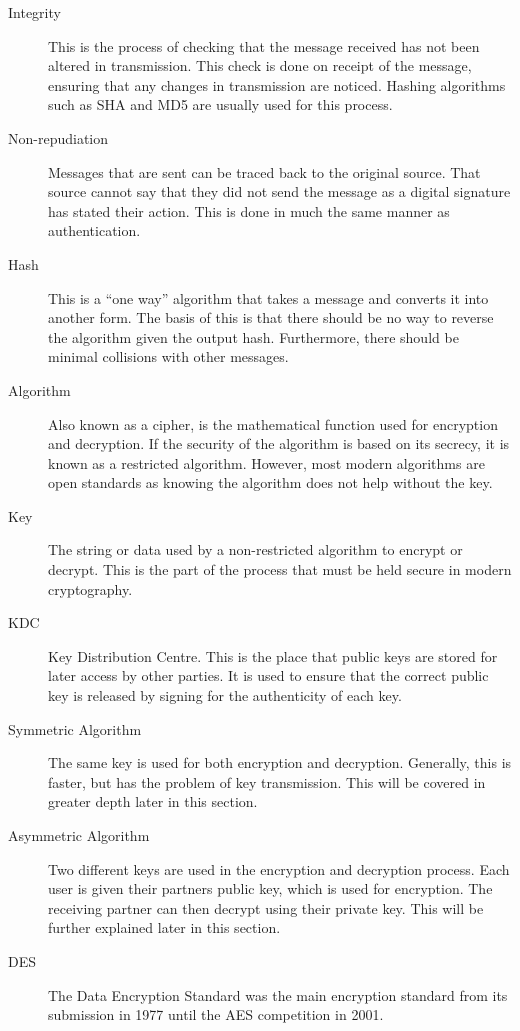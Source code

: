 \begin{description}
				\item[Integrity]
					This is the process of checking that the message received has not been altered in transmission.
					This check is done on receipt of the message, ensuring that any changes in transmission are noticed.
					Hashing algorithms such as SHA and MD5 are usually used for this process.
				\item[Non-repudiation]
					Messages that are sent can be traced back to the original source.
					That source cannot say that they did not send the message as a digital signature has stated their action.
					This is done in much the same manner as authentication.
				\item[Hash]
					This is a ``one way'' algorithm that takes a message and converts it into another form.
					The basis of this is that there should be no way to reverse the algorithm given the output hash.
					Furthermore, there should be minimal collisions with other messages.
				\item[Algorithm] Also known as a cipher, is the mathematical function used for encryption and decryption.
					If the security of the algorithm is based on its secrecy, it is known as a restricted algorithm.
					However, most modern algorithms are open standards as knowing the algorithm does not help without the key.
				\item[Key] The string or data used by a non-restricted algorithm to encrypt or decrypt.
					This is the part of the process that must be held secure in modern cryptography.
				\item[KDC] Key Distribution Centre.
					This is the place that public keys are stored for later access by other parties.
					It is used to ensure that the correct public key is released by signing for the authenticity of each key.
				\item[Symmetric Algorithm] The same key is used for both encryption and decryption.
					Generally, this is faster, but has the problem of key transmission.
					This will be covered in greater depth later in this section.
				\item[Asymmetric Algorithm] Two different keys are used in the encryption and decryption process.
					Each user is given their partners public key, which is used for encryption.
					The receiving partner can then decrypt using their private key.
					This will be further explained later in this section.
				\item[DES] The Data Encryption Standard was the main encryption standard from its submission in 1977 until the AES competition in 2001.

\end{description}
